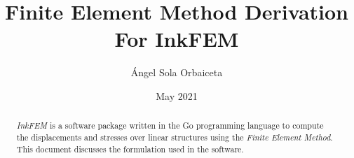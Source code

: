 \documentclass[12pt, letterpaper]{article}
\title{Finite Element Method Derivation For InkFEM}
\author{\'Angel Sola Orbaiceta}
\date{May 2021}
\begin{document}
\maketitle

\begin{abstract}
  \emph{InkFEM} is a software package written in the Go programming language to compute the displacements and stresses over linear structures using the \emph{Finite Element Method}.
  This document discusses the formulation used in the software.
\end{abstract}



\end{document}

